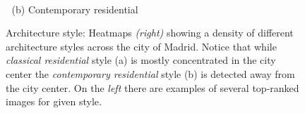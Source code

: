 \begin{figure}
\begin{minipage}{\linewidth}
\begin{minipage}{0.7\linewidth}
    \end{minipage}
  \end{minipage}
  \\
  $\;$\hspace{30mm} (b) Contemporary residential
  \\
  \caption{
    Architecture style: Heatmaps \emph{(right)} showing a density of different architecture styles across the city of Madrid. Notice that while \emph{classical residential} style (a) is mostly concentrated in the city center the \emph{contemporary residential} style (b) is detected away from the city center. On the \emph{left} there are examples of several top-ranked images for given style.
  }
\end{figure}